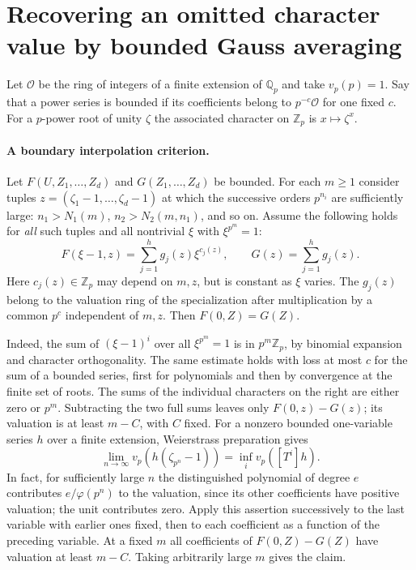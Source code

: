 \documentclass[11pt]{article}
\begin{document}
\section{Recovering an omitted character value by bounded Gauss averaging}
\label{sec:arch-gauss-averaging}
Let $\mathcal O$ be the ring of integers of a finite extension of
$\mathbb Q_p$ and take $v_p(p)=1$. Say that a power series is bounded
if its coefficients belong to $p^{-c}\mathcal O$ for one fixed $c$.
For a $p$-power root of unity $\zeta$ the associated character on
$\mathbb Z_p$ is $x\mapsto\zeta^x$.

\paragraph{A boundary interpolation criterion.}
Let $F(U,Z_1,\ldots,Z_d)$ and $G(Z_1,\ldots,Z_d)$ be bounded.
For each $m\ge1$ consider tuples $z=(\zeta_1-1,\ldots,\zeta_d-1)$
at which the successive orders $p^{n_i}$ are sufficiently large:
$n_1>N_1(m)$, $n_2>N_2(m,n_1)$, and so on. Assume the following
holds for \emph{all} such tuples and all nontrivial $\xi$ with
$\xi^{p^m}=1$:
\[
 F(\xi-1,z)=\sum_{j=1}^h g_j(z)\xi^{c_j(z)},\qquad
 G(z)=\sum_{j=1}^h g_j(z).
\]
Here $c_j(z)\in\mathbb Z_p$ may depend on $m,z$, but is constant
as $\xi$ varies. The $g_j(z)$ belong to the valuation ring of the
specialization after multiplication by a common $p^c$ independent
of $m,z$. Then $F(0,Z)=G(Z)$.

Indeed, the sum of $(\xi-1)^i$ over all $\xi^{p^m}=1$ is in
$p^m\mathbb Z_p$, by binomial expansion and character orthogonality.
The same estimate holds with loss at most $c$ for the sum of a
bounded series, first for polynomials and then by convergence at the
finite set of roots. The sums of the individual characters on the
right are either zero or $p^m$. Subtracting the two full sums leaves
only $F(0,z)-G(z)$; its valuation is at least $m-C$, with $C$ fixed.
For a nonzero bounded one-variable series $h$ over a finite
extension, Weierstrass preparation gives
\[
 \lim_{n\to\infty} v_p(h(\zeta_{p^n}-1))
       =\inf_i v_p([T^i]h).
\]
In fact, for sufficiently large $n$ the distinguished polynomial
of degree $e$ contributes $e/\varphi(p^n)$ to the valuation, since
its other coefficients have positive valuation; the unit contributes
zero. Apply this assertion successively to the last variable with
earlier ones fixed, then to each coefficient as a function of the
preceding variable. At a fixed $m$ all coefficients of
$F(0,Z)-G(Z)$ have valuation at least $m-C$. Taking arbitrarily
large $m$ gives the claim.
\end{document}
